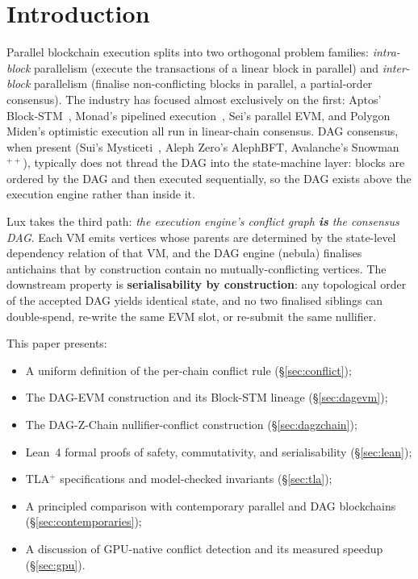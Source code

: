 \section{Introduction}


Parallel blockchain execution splits into two orthogonal problem families:
\emph{intra-block} parallelism (execute the transactions of a linear block
in parallel) and \emph{inter-block} parallelism (finalise non-conflicting
blocks in parallel, a partial-order consensus). The industry has focused
almost exclusively on the first: Aptos' Block-STM~\cite{blockstm}, Monad's
pipelined execution~\cite{monad}, Sei's parallel EVM, and Polygon Miden's
optimistic execution all run in linear-chain consensus. DAG consensus, when
present (Sui's Mysticeti~\cite{mysticeti}, Aleph Zero's AlephBFT,
Avalanche's Snowman$^{++}$), typically does not thread the DAG into the
state-machine layer: blocks are ordered by the DAG and then executed
sequentially, so the DAG exists above the execution engine rather than
inside it.

Lux takes the third path: \emph{the execution engine's conflict graph
\textbf{is} the consensus DAG}. Each VM emits vertices whose parents are
determined by the state-level dependency relation of that VM, and the DAG
engine (nebula) finalises antichains that by construction contain no
mutually-conflicting vertices. The downstream property is
\textbf{serialisability by construction}: any topological order of the
accepted DAG yields identical state, and no two finalised siblings can
double-spend, re-write the same EVM slot, or re-submit the same nullifier.

This paper presents:

\begin{itemize}
  \item A uniform definition of the per-chain conflict rule
    (\S\ref{sec:conflict});
  \item The DAG-EVM construction and its Block-STM lineage
    (\S\ref{sec:dagevm});
  \item The DAG-Z-Chain nullifier-conflict construction
    (\S\ref{sec:dagzchain});
  \item Lean~4 formal proofs of safety, commutativity, and
    serialisability (\S\ref{sec:lean});
  \item TLA$^+$ specifications and model-checked invariants
    (\S\ref{sec:tla});
  \item A principled comparison with contemporary parallel and DAG
    blockchains (\S\ref{sec:contemporaries});
  \item A discussion of GPU-native conflict detection and its measured
    speedup (\S\ref{sec:gpu}).
\end{itemize}

